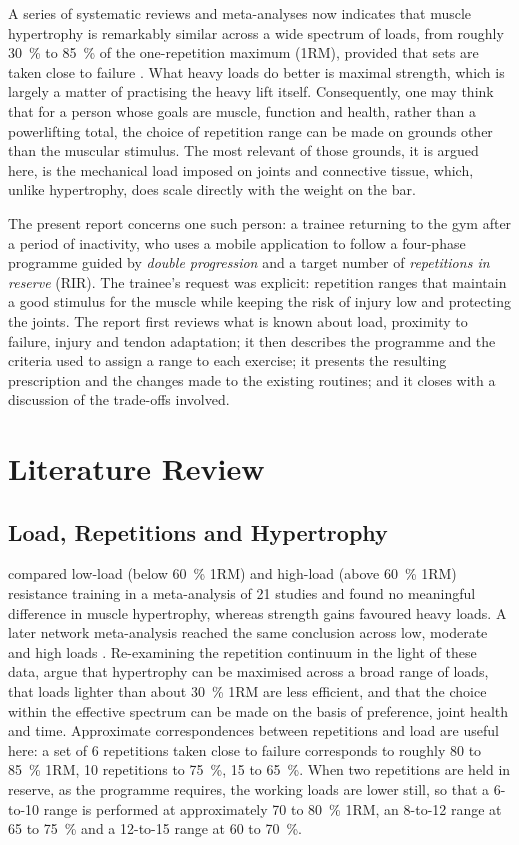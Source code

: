 \documentclass[11pt,a4paper]{article}
\newcommand{\orm}{1RM}
\begin{document}
A series of systematic reviews and meta-analyses now indicates that muscle hypertrophy is remarkably similar across a wide spectrum of loads, from roughly 30~\% to 85~\% of the one-repetition maximum (\orm), provided that sets are taken close to failure \citep{lopez2021,schoenfeld2017,schoenfeld2021}. What heavy loads do better is maximal strength, which is largely a matter of practising the heavy lift itself. Consequently, one may think that for a person whose goals are muscle, function and health, rather than a powerlifting total, the choice of repetition range can be made on grounds other than the muscular stimulus. The most relevant of those grounds, it is argued here, is the mechanical load imposed on joints and connective tissue, which, unlike hypertrophy, does scale directly with the weight on the bar.

The present report concerns one such person: a trainee returning to the gym after a period of inactivity, who uses a mobile application to follow a four-phase programme guided by \emph{double progression} and a target number of \emph{repetitions in reserve} (RIR). The trainee's request was explicit: repetition ranges that maintain a good stimulus for the muscle while keeping the risk of injury low and protecting the joints. The report first reviews what is known about load, proximity to failure, injury and tendon adaptation; it then describes the programme and the criteria used to assign a range to each exercise; it presents the resulting prescription and the changes made to the existing routines; and it closes with a discussion of the trade-offs involved.

\section*{Literature Review}

\subsection*{Load, Repetitions and Hypertrophy}

\citet{schoenfeld2017} compared low-load (below 60~\% \orm) and high-load (above 60~\% \orm) resistance training in a meta-analysis of 21 studies and found no meaningful difference in muscle hypertrophy, whereas strength gains favoured heavy loads. A later network meta-analysis reached the same conclusion across low, moderate and high loads \citep{lopez2021}. Re-examining the repetition continuum in the light of these data, \citet{schoenfeld2021} argue that hypertrophy can be maximised across a broad range of loads, that loads lighter than about 30~\% \orm{} are less efficient, and that the choice within the effective spectrum can be made on the basis of preference, joint health and time. Approximate correspondences between repetitions and load are useful here: a set of 6 repetitions taken close to failure corresponds to roughly 80 to 85~\% \orm, 10 repetitions to 75~\%, 15 to 65~\%. When two repetitions are held in reserve, as the programme requires, the working loads are lower still, so that a 6-to-10 range is performed at approximately 70 to 80~\% \orm, an 8-to-12 range at 65 to 75~\% and a 12-to-15 range at 60 to 70~\%.
\end{document}
